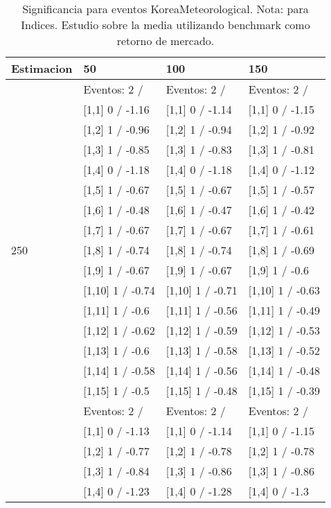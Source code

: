 \begin{table}

\caption{Significancia para eventos KoreaMeteorological. Nota: para Indices. Estudio sobre la media utilizando benchmark como retorno de mercado.}
\centering
\begin{tabular}[t]{llll}
\toprule
Estimacion & 50 & 100 & 150\\
\midrule
 & Eventos:  2 / & Eventos:  2 / & Eventos:  2 /\\
 & {}[1,1] 0  / -1.16 & {}[1,1] 0  / -1.14 & {}[1,1] 0  / -1.15\\
 & {}[1,2] 1  / -0.96 & {}[1,2] 1  / -0.94 & {}[1,2] 1  / -0.92\\
 & {}[1,3] 1  / -0.85 & {}[1,3] 1  / -0.83 & {}[1,3] 1  / -0.81\\
 & {}[1,4] 0  / -1.18 & {}[1,4] 0  / -1.18 & {}[1,4] 0  / -1.12\\
\addlinespace
 & {}[1,5] 1  / -0.67 & {}[1,5] 1  / -0.67 & {}[1,5] 1  / -0.57\\
 & {}[1,6] 1  / -0.48 & {}[1,6] 1  / -0.47 & {}[1,6] 1  / -0.42\\
 & {}[1,7] 1  / -0.67 & {}[1,7] 1  / -0.67 & {}[1,7] 1  / -0.61\\
250 & {}[1,8] 1  / -0.74 & {}[1,8] 1  / -0.74 & {}[1,8] 1  / -0.69\\
 & {}[1,9] 1  / -0.67 & {}[1,9] 1  / -0.67 & {}[1,9] 1  / -0.6\\
\addlinespace
 & {}[1,10] 1  / -0.74 & {}[1,10] 1  / -0.71 & {}[1,10] 1  / -0.63\\
 & {}[1,11] 1  / -0.6 & {}[1,11] 1  / -0.56 & {}[1,11] 1  / -0.49\\
 & {}[1,12] 1  / -0.62 & {}[1,12] 1  / -0.59 & {}[1,12] 1  / -0.53\\
 & {}[1,13] 1  / -0.6 & {}[1,13] 1  / -0.58 & {}[1,13] 1  / -0.52\\
 & {}[1,14] 1  / -0.58 & {}[1,14] 1  / -0.56 & {}[1,14] 1  / -0.48\\
\addlinespace
 & {}[1,15] 1  / -0.5 & {}[1,15] 1  / -0.48 & {}[1,15] 1  / -0.39\\
 & Eventos:  2 / & Eventos:  2 / & Eventos:  2 /\\
 & {}[1,1] 0  / -1.13 & {}[1,1] 0  / -1.14 & {}[1,1] 0  / -1.15\\
 & {}[1,2] 1  / -0.77 & {}[1,2] 1  / -0.78 & {}[1,2] 1  / -0.78\\
 & {}[1,3] 1  / -0.84 & {}[1,3] 1  / -0.86 & {}[1,3] 1  / -0.86\\
\addlinespace
 & {}[1,4] 0  / -1.23 & {}[1,4] 0  / -1.28 & {}[1,4] 0  / -1.3\\

\end{tabular}
\end{table}
